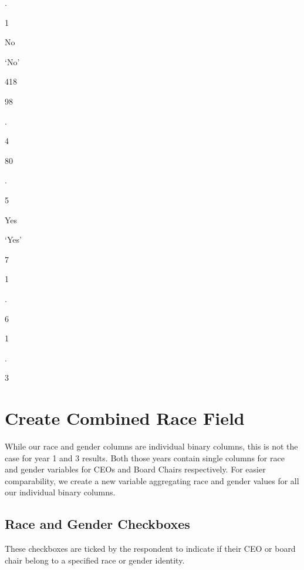 \documentclass[
  letterpaper,
]{scrbook}
\begin{document}
.

1

No

`No'

418

98

.

4

80

.

5

Yes

`Yes'

7

1

.

6

1

.

3

\chapter{Create Combined Race Field}\label{create-combined-race-field}

While our race and gender columns are individual binary columns, this is
not the case for year 1 and 3 results. Both those years contain single
columns for race and gender variables for CEOs and Board Chairs
respectively. For easier comparability, we create a new variable
aggregating race and gender values for all our individual binary
columns.

\section{Race and Gender Checkboxes}\label{race-and-gender-checkboxes-1}

These checkboxes are ticked by the respondent to indicate if their CEO
or board chair belong to a specified race or gender identity.
\end{document}
